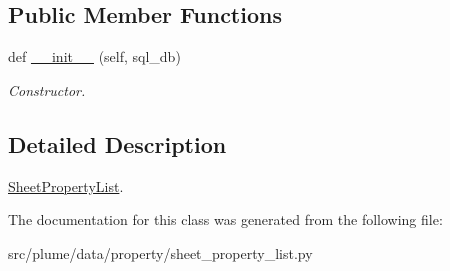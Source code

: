 \subsection*{Public Member Functions}
\begin{DoxyCompactItemize}
\item 
def \hyperlink{classplume-creator_1_1src_1_1plume_1_1data_1_1property_1_1sheet__property__list_1_1_sheet_property_list_ad7d444e221992a8b946cd824985a5fee}{\+\_\+\+\_\+init\+\_\+\+\_\+} (self, sql\+\_\+db)\hypertarget{classplume-creator_1_1src_1_1plume_1_1data_1_1property_1_1sheet__property__list_1_1_sheet_property_list_ad7d444e221992a8b946cd824985a5fee}{}\label{classplume-creator_1_1src_1_1plume_1_1data_1_1property_1_1sheet__property__list_1_1_sheet_property_list_ad7d444e221992a8b946cd824985a5fee}

\begin{DoxyCompactList}\small\item\em Constructor. \end{DoxyCompactList}\end{DoxyCompactItemize}


\subsection{Detailed Description}
\hyperlink{classplume-creator_1_1src_1_1plume_1_1data_1_1property_1_1sheet__property__list_1_1_sheet_property_list}{Sheet\+Property\+List}. 

The documentation for this class was generated from the following file\+:\begin{DoxyCompactItemize}
\item 
src/plume/data/property/sheet\+\_\+property\+\_\+list.\+py\end{DoxyCompactItemize}
